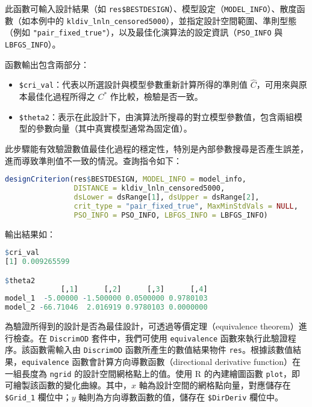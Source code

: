 此函數可輸入設計結果（如 \verb|res$BESTDESIGN|）、模型設定（\verb|MODEL_INFO|）、散度函數（如本例中的 \verb|kldiv_lnln_censored5000|），並指定設計空間範圍、準則型態（例如 \verb|"pair_fixed_true"|），以及最佳化演算法的設定資訊（\verb|PSO_INFO| 與 \verb|LBFGS_INFO|）。

函數輸出包含兩部分：

\begin{itemize}
\item \verb|$cri_val|：代表以所選設計與模型參數重新計算所得的準則值 $\hat{C}$，可用來與原本最佳化過程所得之 $C^*$ 作比較，檢驗是否一致。

\item \verb|$theta2|：表示在此設計下，由演算法所搜尋的對立模型參數值，包含兩組模型的參數向量（其中真實模型通常為固定值）。

\end{itemize}

此步驟能有效驗證數值最佳化過程的穩定性，特別是內部參數搜尋是否產生誤差，進而導致準則值不一致的情況。查詢指令如下：

\begin{lstlisting}[language=R, caption={驗證設計的穩定性與參數搜尋}]
designCriterion(res$BESTDESIGN, MODEL_INFO = model_info,
                DISTANCE = kldiv_lnln_censored5000,
                dsLower = dsRange[1], dsUpper = dsRange[2],
                crit_type = "pair_fixed_true", MaxMinStdVals = NULL,
                PSO_INFO = PSO_INFO, LBFGS_INFO = LBFGS_INFO)
\end{lstlisting}

輸出結果如：

\begin{lstlisting}[language=R, caption={驗證設計穩定性與參數搜尋的結果}]
$cri_val
[1] 0.009265599

$theta2
             [,1]      [,2]      [,3]      [,4]
model_1  -5.00000 -1.500000 0.0500000 0.9780103
model_2 -66.71046  2.016919 0.9780103 0.0000000
\end{lstlisting}

為驗證所得到的設計是否為最佳設計，可透過等價定理（equivalence theorem）進行檢查。在 \verb|DiscrimOD| 套件中，我們可使用 \verb|equivalence| 函數來執行此驗證程序。該函數需輸入由 \verb|DiscrimOD| 函數所產生的數值結果物件 \verb|res|。根據該數值結果，\verb|equivalence| 函數會計算方向導數函數（directional derivative function）在一組長度為 \verb|ngrid| 的設計空間網格點上的值。使用 R 的內建繪圖函數 \verb|plot|，即可繪製該函數的變化曲線。其中，$x$ 軸為設計空間的網格點向量，對應儲存在 \verb|$Grid_1| 欄位中；$y$ 軸則為方向導數函數的值，儲存在 \verb|$DirDeriv| 欄位中。

